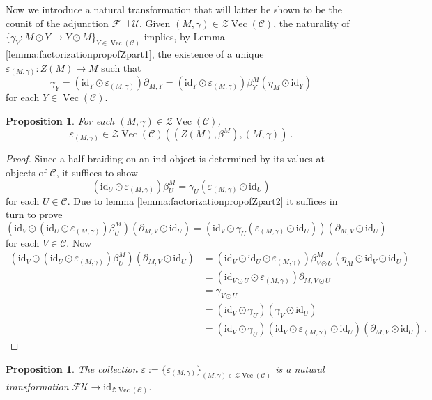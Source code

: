 \documentclass[a4paper,11pt,reqno]{amsart}
\numberwithin{equation}{section}
\newtheorem{proposition}[theorem]{Proposition}
\theoremstyle{remark}
\theoremstyle{definition}
\newcommand{\cC}{\mathcal C}
\newcommand{\cF}{\mathcal F}
\newcommand{\cU}{\mathcal U}
\newcommand{\cZ}{\mathcal Z}
\DeclareMathOperator{\Vect}{Vec}
\newcommand{\id}{\mathrm{id}}
\begin{document}
Now we introduce a natural transformation that will latter be shown to be the counit of the adjunction $\cF \dashv \cU$. Given $(M,\gamma) \in \cZ \Vect(\cC)$, the naturality of $\{\gamma_Y: M \odot Y \to Y \odot M \}_{Y \in \Vect(\cC)}$ implies, by Lemma \ref{lemma:factorizationpropofZpart1}, the existence of a unique $\varepsilon_{(M,\gamma)}: Z(M) \to M$ such that
$$ \gamma_Y = (\id_Y \odot \varepsilon_{(M,\gamma)})\partial_{M,Y} = (\id_Y \odot \varepsilon_{(M,\gamma)}) \beta^M_Y (\eta_M \odot \id_Y) $$
for each $Y \in \Vect(\cC)$.

\begin{proposition}
	For each $(M,\gamma) \in \cZ \Vect(\cC)$, $$\varepsilon_{(M,\gamma)} \in \cZ \Vect(\cC)((Z(M),\beta^M),(M,\gamma)) \ . $$
\end{proposition}
\begin{proof}
	Since a half-braiding on an ind-object is determined by its values at objects of $\cC$, it suffices to show
	$$(\id_U \odot \varepsilon_{(M,\gamma)})\beta^M_U = \gamma_U (\varepsilon_{(M,\gamma)} \odot \id_U)$$
	for each $U \in \cC$. Due to lemma \ref{lemma:factorizationpropofZpart2} it suffices in turn to prove 
	$$(\id_V \odot (\id_U \odot \varepsilon_{(M,\gamma)})\beta^M_U)(\partial_{M,V} \odot \id_U) = (\id_V \odot \gamma_U(\varepsilon_{(M,\gamma)} \odot \id_U))(\partial_{M,V} \odot \id_U)$$
	for each $V \in \cC$. Now
	\begin{align*}
		(\id_V \odot (\id_U \odot \varepsilon_{(M,\gamma)})\beta^M_U)(\partial_{M,V} \odot \id_U) & = (\id_V \odot \id_U \odot \varepsilon_{(M,\gamma)}) \beta^M_{V \odot U} (\eta_M \odot \id_V \odot \id_U) \\
		& = (\id_{V \odot U} \odot \varepsilon_{(M,\gamma)}) \partial_{M, V \odot U} \\
		& = \gamma_{V \odot U} \\
		& = (\id_V \odot \gamma_U)(\gamma_V \odot \id_U) \\
		& = (\id_V \odot \gamma_U)(\id_V \odot \varepsilon_{(M,\gamma)} \odot \id_U) (\partial_{M,V}\odot \id_U) \ .
	\end{align*}
\end{proof}


\begin{proposition}
	The collection $\varepsilon := \{ \varepsilon_{(M,\gamma)}\}_{(M,\gamma) \in \cZ \Vect(\cC)}$ is a natural transformation $\cF \cU \to \id_{\cZ \Vect(\cC)}$.
	\label{prop:naturalityofvarepsilon}
\end{proposition}
\end{document}
